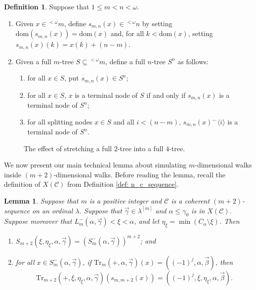 \documentclass{amsart}
\numberwithin{theorem}{section}
\newtheorem{lemma}[theorem]{Lemma}
\theoremstyle{definition}
\newtheorem{definition}[theorem]{Definition}
\newcommand{\dom}{\mathrm{dom}}
\newcommand{\mc}{\mathcal}
\begin{document}
\begin{definition}
  Suppose that $1 \leq m < n < \omega$.
  \begin{enumerate}
    \item Given $x \in {^{<\omega}}m$, define $s_{m,n}(x) \in {^{<\omega}}n$ by 
    setting $\dom(s_{m,n}(x)) = \dom(x)$ and, for all $k < \dom(x)$, setting 
    $s_{m,n}(x)(k) = x(k) + (n-m)$.
    \item Given a full $m$-tree $S \subseteq {^{<\omega}}m$, define a full 
    $n$-tree $S^n$ as follows:
    \begin{enumerate}
      \item for all $x \in S$, put $s_{m,n}(x) \in S^n$;
      \item for all $x \in S$, $x$ is a terminal node of $S$ if and only if 
      $s_{m,n}(x)$ is a terminal node of $S^n$;
      \item for all splitting nodes $x \in S$ and all $i < (n-m)$, 
      $s_{m,n}(x)^\smallfrown \langle i \rangle$ is a terminal node of $S^n$.
    \end{enumerate}
  \end{enumerate}
\end{definition}

\begin{figure}[ht]
\caption{The effect of stretching a full $2$-tree into a full $4$-tree.}
\label{augmented_tree}
\end{figure}

We now present our main technical lemma about simulating $m$-dimensional walks inside 
$(m+2)$-dimensional walks. Before reading the lemma, recall the definition of 
$X(\mc{C})$ from Definition \ref{def: n_c_sequence}.

\begin{lemma}\label{simulation}
  Suppose that $m$ is a positive integer and $\mc{C}$ is a coherent 
  $(m+2)$-sequence on an ordinal $\lambda$. Suppose that $\vec{\gamma} \in 
  \lambda^{[m]}$ and $\alpha \leq \gamma_0$ is in $X(\mc{C})$.
  Suppose moreover that $L_m^-(\alpha,\vec{\gamma}) < \xi < \alpha$, and
  let $\eta_\xi = \min(C_\alpha \setminus \xi)$. Then
  \begin{enumerate}
    \item $S_{m+2}(\xi,\eta_\xi,\alpha,\vec{\gamma}) = 
    (S^-_m(\alpha,\vec{\gamma}))^{m+2}$; and
    \item for all $x \in S^-_m(\alpha,\vec{\gamma})$, if 
    $\mathrm{Tr}_m(+,\alpha,\vec{\gamma})(x) = ((-1)^j,\alpha,\vec{\beta})$, 
    then 
    \[
      \mathrm{Tr}_{m+2}(+,\xi,\eta_\xi,\alpha,\vec{\gamma})(s_{m,m+2}(x)) = 
      ((-1)^j,\xi,\eta_\xi,\alpha,\vec{\beta}).
    \]
  \end{enumerate}
\end{lemma}
\end{document}
